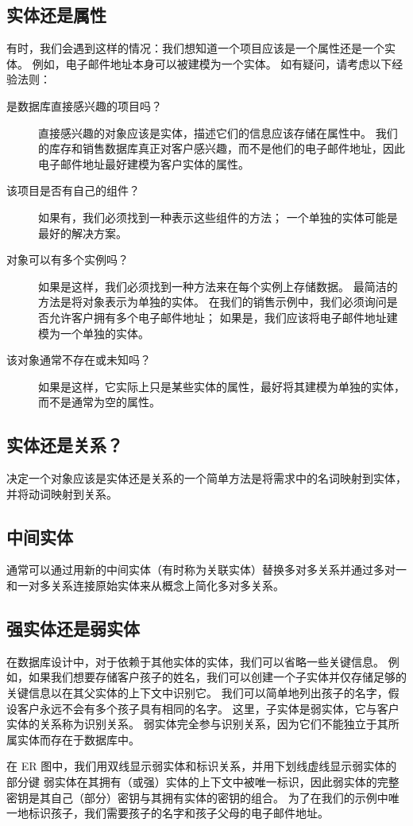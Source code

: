 \subsection{实体还是属性}
有时，我们会遇到这样的情况：我们想知道一个项目应该是一个属性还是一个实体。 例如，电子邮件地址本身可以被建模为一个实体。 如有疑问，请考虑以下经验法则：
\begin{description}
    \item[是数据库直接感兴趣的项目吗？]直接感兴趣的对象应该是实体，描述它们的信息应该存储在属性中。 我们的库存和销售数据库真正对客户感兴趣，而不是他们的电子邮件地址，因此电子邮件地址最好建模为客户实体的属性。
    \item[该项目是否有自己的组件？]如果有，我们必须找到一种表示这些组件的方法； 一个单独的实体可能是最好的解决方案。
    \item[对象可以有多个实例吗？]如果是这样，我们必须找到一种方法来在每个实例上存储数据。 最简洁的方法是将对象表示为单独的实体。 在我们的销售示例中，我们必须询问是否允许客户拥有多个电子邮件地址； 如果是，我们应该将电子邮件地址建模为一个单独的实体。
    \item[该对象通常不存在或未知吗？]如果是这样，它实际上只是某些实体的属性，最好将其建模为单独的实体，而不是通常为空的属性。
\end{description}
\subsection{实体还是关系？}

决定一个对象应该是实体还是关系的一个简单方法是将需求中的名词映射到实体，并将动词映射到关系。
\subsection{中间实体}

通常可以通过用新的中间实体（有时称为关联实体）替换多对多关系并通过多对一和一对多关系连接原始实体来从概念上简化多对多关系。
\subsection{强实体还是弱实体}
在数据库设计中，对于依赖于其他实体的实体，我们可以省略一些关键信息。 例如，如果我们想要存储客户孩子的姓名，我们可以创建一个子实体并仅存储足够的关键信息以在其父实体的上下文中识别它。 我们可以简单地列出孩子的名字，假设客户永远不会有多个孩子具有相同的名字。 这里，子实体是弱实体，它与客户实体的关系称为识别关系。 弱实体完全参与识别关系，因为它们不能独立于其所属实体而存在于数据库中。

在 ER 图中，我们用双线显示弱实体和标识关系，并用下划线虚线显示弱实体的部分键 弱实体在其拥有（或强）实体的上下文中被唯一标识，因此弱实体的完整密钥是其自己（部分）密钥与其拥有实体的密钥的组合。 为了在我们的示例中唯一地标识孩子，我们需要孩子的名字和孩子父母的电子邮件地址。

